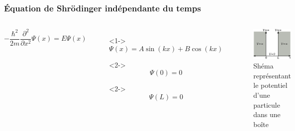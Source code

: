 \documentclass[aspectratio=169]{beamer}
\begin{document}
\begin{frame}
\frametitle{Équation de Shrödinger indépendante du temps}

\begin{columns}

\begin{equation}\tag{4}
-\frac{\hbar^2}{2m}\frac{\partial^2}{\partial x^2}\Psi(x)=E\Psi(x)
\end{equation} 

\begin{itemize}
\item[]<1-> \begin{equation}\tag{5}
\Psi(x)=A\sin(kx)+B\cos(kx)
\end{equation} 
\item[]<2-> \begin{equation}\tag{6}
\Psi(0)=0
\end{equation} 
\item[]<2-> \begin{equation}\tag{7}
\Psi(L)=0
\end{equation} 
\end{itemize}
\begin{figure}
\includegraphics[scale=0.4]{Pot}
\caption{Shéma représentant le potentiel d'une particule dans une boîte}
\end{figure}
\end{columns}

\end{frame}
\end{document}
